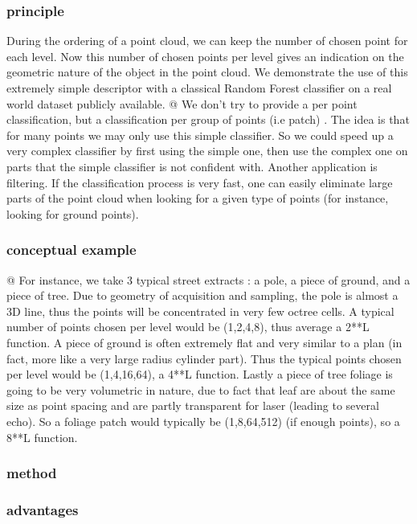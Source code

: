 		\subsubsection{principle}
			During the ordering of a point cloud, we can keep the number of chosen point for each level.
			Now this number of chosen points per level gives an indication on the geometric nature of the object in the point cloud. 
			We demonstrate the use of this extremely simple descriptor with a classical Random Forest classifier on a real world dataset publicly available.
			@
			We don't try to provide a per point classification, but a classification per group of points (i.e patch) . 
			The idea is that for many points we may only use this simple classifier. So we could speed up a very complex classifier by first using the simple one, then use the complex one on parts that the simple classifier is not confident with.
			Another application is filtering. If the classification process is very fast, one can easily eliminate large parts of the point cloud when looking for a given type of points (for instance, looking for ground points).
		\subsubsection{conceptual example}
			@
			For instance, we take 3 typical street extracts : a pole, a piece of ground, and a piece of tree.
			Due to geometry of acquisition and sampling, the pole is almost a 3D line, thus the points will be concentrated in very few octree cells.
			A typical number of points chosen per level would be (1,2,4,8), thus average a 2**L function.
			A piece of ground is often extremely flat and very similar to a plan (in  fact, more like a very large radius cylinder part).
			Thus the typical points chosen per level would be (1,4,16,64), a 4**L function.
			Lastly a piece of tree foliage is going to be very volumetric in nature, due to fact that leaf are about the same size as point spacing and are partly transparent for laser (leading to several echo).
			So a foliage patch would typically be (1,8,64,512) (if enough points), so a 8**L function.
			
		\subsubsection{method}	
		\subsubsection{advantages}
